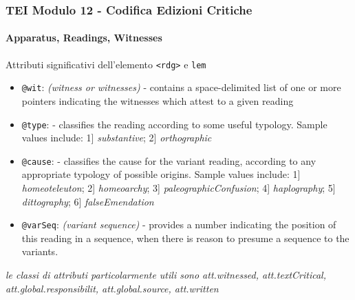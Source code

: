 



\begin{frame}
    \frametitle{TEI Modulo 12 - Codifica Edizioni Critiche}
    \framesubtitle{Apparatus, Readings, Witnesses}
    \addtocounter{nframe}{1}

    \begin{block}{Attributi significativi dell'elemento \texttt{<rdg>} e \texttt{lem}}
        \begin{itemize}
            \item \texttt{@wit}: \textit{(witness or witnesses)} - contains a space-delimited list of one or more pointers indicating the witnesses which attest to a given reading
            \item \texttt{@type}: \textit{} - classifies the reading according to some useful typology. Sample values include: 1] \textit{substantive}; 2] \textit{orthographic}
            \item \texttt{@cause}: \textit{} - classifies the cause for the variant reading, according to any appropriate typology of possible origins. Sample values include: 1] \textit{homeoteleuton}; 2] \textit{homeoarchy}; 3] \textit{paleographicConfusion}; 4] \textit{haplography}; 5] \textit{dittography}; 6] \textit{falseEmendation}
            \item \texttt{@varSeq}: \textit{(variant sequence)} - provides a number indicating the position of this reading in a sequence, when there is reason to presume a sequence to the variants.
        \end{itemize}
    \end{block}

    \textit{le classi di attributi particolarmente utili sono att.witnessed, att.textCritical, att.global.responsibilit, att.global.source, att.written}


\end{frame}

